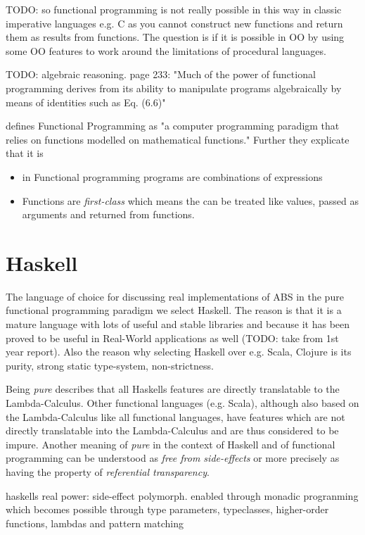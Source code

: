 TODO: so functional programming is not really possible in this way in classic imperative languages e.g. C as you cannot construct new functions and return them as results from functions. The question is if it is possible in OO by using some OO features to work around the limitations of procedural languages.

TODO: algebraic reasoning. \cite{maclennan_functional_1990} page 233: "Much of the power of functional programming derives from its ability to manipulate programs algebraically by means of identities such as Eq. (6.6)"

\cite{allen_haskell_2016} defines Functional Programming as "a computer programming paradigm that relies on functions modelled on mathematical functions." Further they explicate that it is 
\begin{itemize}
	\item in Functional programming programs are combinations of expressions
	\item Functions are \textit{first-class} which means the can be treated like values, passed as arguments and returned from functions.
\end{itemize}

\section{Haskell}
The language of choice for discussing real implementations of ABS in the pure functional programming paradigm we select Haskell. The reason is that it is a mature language with lots of useful and stable libraries and because it has been proved to be useful in Real-World applications as well (TODO: take from 1st year report). Also the reason why selecting Haskell over e.g. Scala, Clojure is its purity, strong static type-system, non-strictness.

Being \textit{pure} describes that all Haskells features are directly translatable to the Lambda-Calculus. Other functional languages (e.g. Scala), although also based on the Lambda-Calculus like all functional languages, have features which are not directly translatable into the Lambda-Calculus and are thus considered to be impure. Another meaning of \textit{pure} in the context of Haskell and of functional programming can be understood as \textit{free from side-effects} or more precisely as having the property of \textit{referential transparency}. 

haskells real power: side-effect polymorph. enabled through monadic progranming which becomes possible through type parameters, typeclasses, higher-order functions, lambdas and pattern matching

